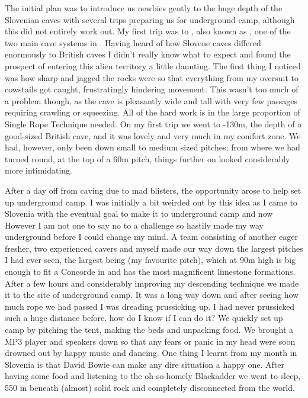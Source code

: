 The initial plan was to introduce us newbies gently to the huge depth of the Slovenian caves with
several trips preparing us for underground camp, although this did not entirely work out. My first
trip was to , also known as , one of the two main cave systems in .
Having heard of how Slovene caves differed enormously to British caves I didn't really know what
to expect and found the prospect of entering this alien territory a little daunting. The first thing I
noticed was how sharp and jagged the rocks were so that everything from my oversuit to cowstails got
caught, frustratingly hindering movement. This wasn't too much of a problem though, as the cave is
pleasantly wide and tall with very few passages requiring crawling or squeezing. All of the hard work
is in the large proportion of Single Rope Technique needed. On my first trip we went to -130m, the
depth of a good-sized British cave, and it was lovely and very much in my comfort zone. We had, however, only been down small to medium sized pitches; from where we had turned round, at the top
of a 60m pitch, things further on looked considerably more intimidating.


After a day off from caving due to mad blisters, the opportunity arose to help set up underground
camp. I was initially a bit weirded out by this idea as I came to Slovenia with the eventual goal to make
it to underground camp and now  However I am
not one to say no to a challenge so hastily made my way underground before I could change my mind.
A team consisting of another eager fresher, two experienced cavers and myself made our way down the
largest pitches I had ever seen, the largest being  (my favourite pitch), which at 90m high is
big enough to fit a Concorde in and has the most magnificent limestone formations. After a few hours
and considerably improving my descending technique we made it to the site of underground camp. It
was a long way down and after seeing how much rope we had passed I was dreading prussicking up. I
had never prussicked such a huge distance before, how do I know if I can do it? We quickly set up camp
by pitching the tent, making the beds and unpacking food. We brought a MP3 player and speakers
down so that any fears or panic in my head were soon drowned out by happy music and dancing. One
thing I learnt from my month in Slovenia is that David Bowie can make any dire situation a happy
one. After having some food and listening to the oh-so-homely Blackadder we went to sleep, 550 m
beneath (almost) solid rock and completely disconnected from the world.



